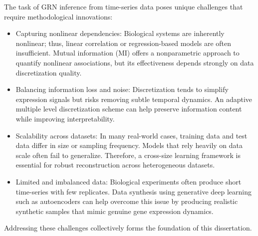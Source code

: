 The task of GRN inference from time-series data poses unique challenges that require methodological innovations:
\begin{itemize}
\item Capturing nonlinear dependencies: Biological systems are inherently nonlinear; thus, linear correlation or regression-based models are often insufficient. Mutual information (MI) offers a nonparametric approach to quantify nonlinear associations, but its effectiveness depends strongly on data discretization quality.

\item Balancing information loss and noise: Discretization tends to simplify expression signals but risks removing subtle temporal dynamics. An adaptive multiple level discretization scheme can help preserve information content while improving interpretability.

\item Scalability across datasets: In many real-world cases, training data and test data differ in size or sampling frequency. Models that rely heavily on data scale often fail to generalize. Therefore, a cross-size learning framework is essential for robust reconstruction across heterogeneous datasets.

\item Limited and imbalanced data: Biological experiments often produce short time-series with few replicates. Data synthesis using generative deep learning such as autoencoders can help overcome this issue by producing realistic synthetic samples that mimic genuine gene expression dynamics.
\end{itemize}
Addressing these challenges collectively forms the foundation of this dissertation.


